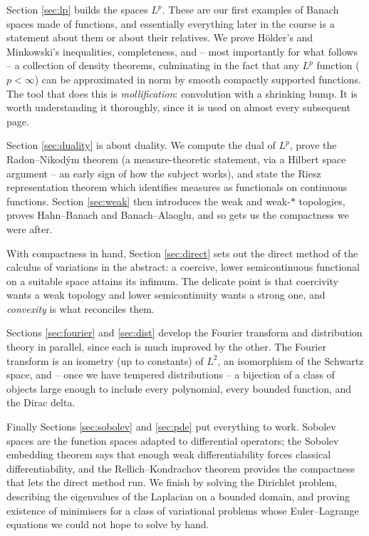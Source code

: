 Section \ref{sec:lp} builds the spaces $L^p$. These are our first examples of Banach spaces made of functions, and essentially everything later in the course is a statement about them or about their relatives. We prove H\"older's and Minkowski's inequalities, completeness, and -- most importantly for what follows -- a collection of density theorems, culminating in the fact that any $L^p$ function ($p < \infty$) can be approximated in norm by smooth compactly supported functions. The tool that does this is \emph{mollification}: convolution with a shrinking bump. It is worth understanding it thoroughly, since it is used on almost every subsequent page.

Section \ref{sec:duality} is about duality. We compute the dual of $L^p$, prove the Radon--Nikod\'ym theorem (a measure-theoretic statement, via a Hilbert space argument -- an early sign of how the subject works), and state the Riesz representation theorem which identifies measures as functionals on continuous functions. Section \ref{sec:weak} then introduces the weak and weak-$*$ topologies, proves Hahn--Banach and Banach--Alaoglu, and so gets us the compactness we were after.

With compactness in hand, Section \ref{sec:direct} sets out the direct method of the calculus of variations in the abstract: a coercive, lower semicontinuous functional on a suitable space attains its infimum. The delicate point is that coercivity wants a weak topology and lower semicontinuity wants a strong one, and \emph{convexity} is what reconciles them.

Sections \ref{sec:fourier} and \ref{sec:dist} develop the Fourier transform and distribution theory in parallel, since each is much improved by the other. The Fourier transform is an isometry (up to constants) of $L^2$, an isomorphism of the Schwartz space, and -- once we have tempered distributions -- a bijection of a class of objects large enough to include every polynomial, every bounded function, and the Dirac delta.

Finally Sections \ref{sec:sobolev} and \ref{sec:pde} put everything to work. Sobolev spaces are the function spaces adapted to differential operators; the Sobolev embedding theorem says that enough weak differentiability forces classical differentiability, and the Rellich--Kondrachov theorem provides the compactness that lets the direct method run. We finish by solving the Dirichlet problem, describing the eigenvalues of the Laplacian on a bounded domain, and proving existence of minimisers for a class of variational problems whose Euler--Lagrange equations we could not hope to solve by hand.

